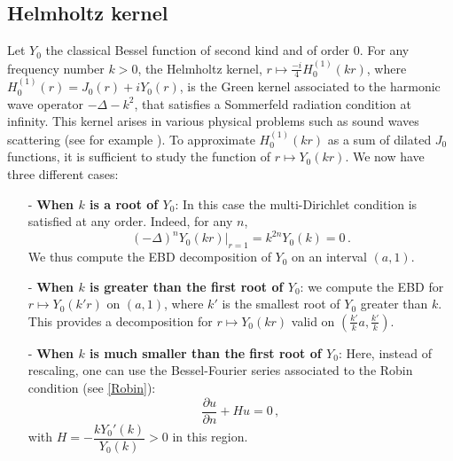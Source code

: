 \documentclass[main]{subfiles}
\begin{document}
\subsection{Helmholtz kernel}
\label{HelmoholtzSubSection}
Let $Y_0$ the classical Bessel function of second kind and of order $0$. For any frequency number $k>0$, the Helmholtz kernel, $r \mapsto \frac{-i}{4}H^{(1)}_0(kr)$, where $H^{(1)}_0(r) = J_0(r) + i Y_0(r)$, is the Green kernel associated to the harmonic wave operator $- \Delta - k^2$, that satisfies a Sommerfeld radiation condition at infinity. This kernel arises in various physical problems such as sound waves scattering  (see for example  \cite{wilcox1975scattering}). To approximate $H^{(1)}_0(kr)$ as a sum of dilated $J_0$ functions, it is sufficient to study the function of $r \mapsto Y_0(kr)$. We now have three different cases:
\begin{itemize}
	\item[-]\textbf{When $k$ is a root of $Y_0$}: In this case the multi-Dirichlet condition is satisfied at any order. Indeed, for any $n$, 
	\[(-\Delta)^n Y_0(kr)\big|_{r=1} = k^{2n} Y_0(k) = 0\,.\]
	We thus compute the EBD decomposition of $Y_0$ on an interval $(a,1)$. 
	\item[-]\textbf{When $k$ is greater than the first root of $Y_0$}: we compute the EBD for $r \mapsto Y_0(k'r)$ on $(a,1)$, where $k'$ is the smallest root of $Y_0$ greater than $k$. This provides a decomposition for $r \mapsto Y_0(kr)$ valid on $(\frac{k'}{k}a,\frac{k'}{k})$.
	\item[-]\textbf{When $k$ is much smaller than the first root of $Y_0$}: Here, instead of rescaling, one can use the Bessel-Fourier series associated to the Robin condition (see \autoref{Robin}):
	\[\dfrac{\partial u}{\partial n} + H u = 0\,,\]
	with $H = -\dfrac{k Y_0'(k)}{Y_0(k)} > 0$ in this region. 
\end{itemize}
\noindent
\end{document}
